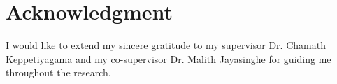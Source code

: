 \chapter*{Acknowledgment}

I would like to extend my sincere gratitude to my supervisor Dr. Chamath Keppetiyagama and my co-supervisor Dr. Malith Jayasinghe for guiding me throughout the research.
